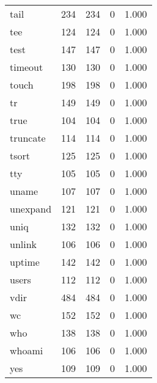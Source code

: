 \begin{longtable}{lp{3.0cm}p{3.0cm}p{3.0cm}p{3.0cm}}
tail      &                     234 &              234 &                 0 &                        1.000 \\
tee       &                     124 &              124 &                 0 &                        1.000 \\
test      &                     147 &              147 &                 0 &                        1.000 \\
timeout   &                     130 &              130 &                 0 &                        1.000 \\
touch     &                     198 &              198 &                 0 &                        1.000 \\
tr        &                     149 &              149 &                 0 &                        1.000 \\
true      &                     104 &              104 &                 0 &                        1.000 \\
truncate  &                     114 &              114 &                 0 &                        1.000 \\
tsort     &                     125 &              125 &                 0 &                        1.000 \\
tty       &                     105 &              105 &                 0 &                        1.000 \\
uname     &                     107 &              107 &                 0 &                        1.000 \\
unexpand  &                     121 &              121 &                 0 &                        1.000 \\
uniq      &                     132 &              132 &                 0 &                        1.000 \\
unlink    &                     106 &              106 &                 0 &                        1.000 \\
uptime    &                     142 &              142 &                 0 &                        1.000 \\
users     &                     112 &              112 &                 0 &                        1.000 \\
vdir      &                     484 &              484 &                 0 &                        1.000 \\
wc        &                     152 &              152 &                 0 &                        1.000 \\
who       &                     138 &              138 &                 0 &                        1.000 \\
whoami    &                     106 &              106 &                 0 &                        1.000 \\
yes       &                     109 &              109 &                 0 &                        1.000 \\
\end{longtable}
